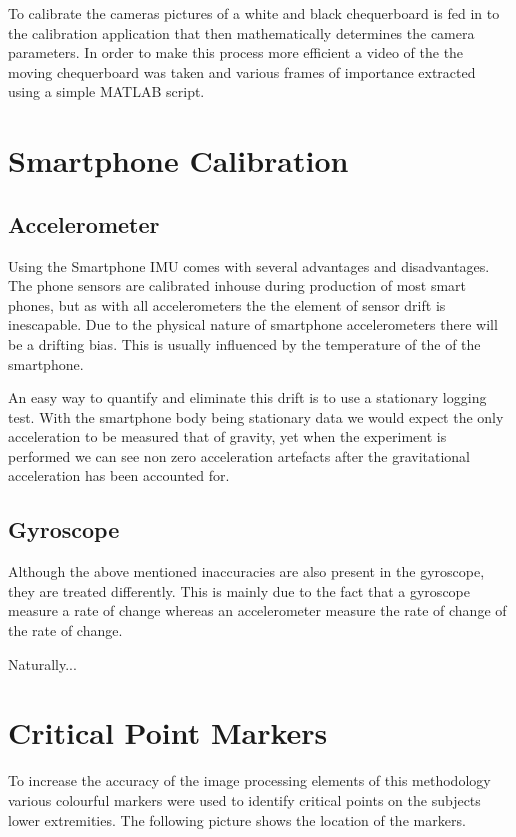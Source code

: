 To calibrate the cameras pictures of a white and black chequerboard is fed in to the calibration application that then mathematically determines the camera parameters. In order to make this process more efficient a video of the the moving chequerboard was taken and various frames of importance extracted using a simple MATLAB script. 

\section{Smartphone Calibration}

\subsection{Accelerometer}
Using the Smartphone IMU comes with several advantages and disadvantages. The phone sensors are calibrated inhouse during production of most smart phones, but as with all accelerometers the the element of sensor drift is inescapable. Due to the physical nature of smartphone accelerometers there will be a drifting bias. This is usually influenced by the temperature of the of the smartphone.

An easy way to quantify and eliminate this drift is to use a stationary logging test. With the smartphone body being stationary data we would expect the only acceleration to be measured that of gravity, yet when the experiment is performed we can see non zero acceleration artefacts after the gravitational acceleration has been accounted for.

\subsection{Gyroscope}
Although the above mentioned inaccuracies are also present in the gyroscope, they are treated differently. This is mainly due to the fact that a gyroscope measure a rate of change whereas an accelerometer measure the rate of change of the rate of change. 

Naturally... 

\section{Critical Point Markers}
To increase the accuracy of the image processing elements of this methodology various colourful markers were used to identify critical points on the subjects lower extremities. The following picture shows the location of the markers.


